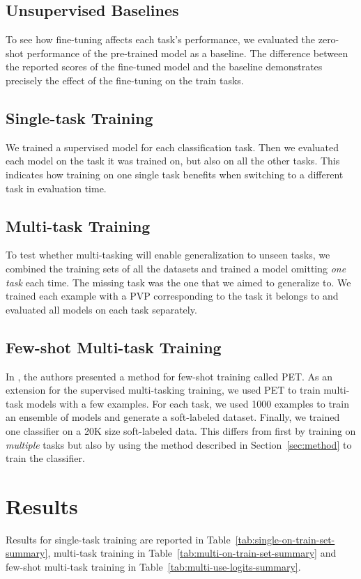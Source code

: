 \documentclass[11pt,a4paper]{article}
\begin{document}
\subsection{Unsupervised Baselines}
To see how fine-tuning affects each task's performance, we evaluated the zero-shot performance of the pre-trained model as a baseline.
The difference between the reported scores of the fine-tuned model and the baseline demonstrates precisely the effect of the fine-tuning on the train tasks.

\subsection{Single-task Training}
We trained a supervised model for each classification task.
Then we evaluated each model on the task it was trained on, but also on all the other tasks.
This indicates how training on one single task benefits when switching to a different task in evaluation time.

\subsection{Multi-task Training}
To test whether multi-tasking will enable generalization to unseen tasks, we combined the training sets of all the datasets and trained a model omitting \textit{one task} each time.
The missing task was the one that we aimed to generalize to.
We trained each example with a PVP corresponding to the task it belongs to and evaluated all models on each task separately.

\subsection{Few-shot Multi-task Training}
In \citet{schick2020exploiting}, the authors presented a method for few-shot training called PET.
As an extension for the supervised multi-tasking training, we used PET to train multi-task models with a few examples.
For each task, we used 1000 examples to train an ensemble of models and generate a soft-labeled dataset.
Finally, we trained one classifier on a 20K size soft-labeled data.
This differs from \citet{schick2020exploiting} first by training on \textit{multiple} tasks but also by using the method described in Section~\ref{sec:method} to train the classifier.

\section{Results}
Results for single-task training are reported in Table~\ref{tab:single-on-train-set-summary},
multi-task training in Table~\ref{tab:multi-on-train-set-summary}
and few-shot multi-task training in Table~\ref{tab:multi-use-logits-summary}.
\end{document}
